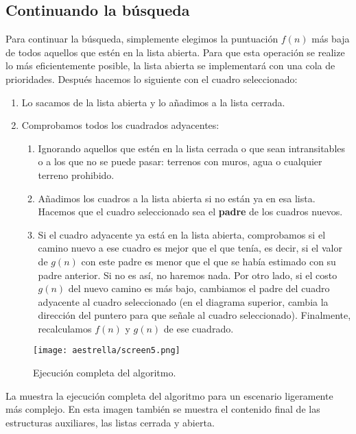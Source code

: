 \subsection{Continuando la b\'usqueda}

Para continuar la búsqueda, simplemente elegimos la puntuación \(f(n)\) más baja de todos aquellos que estén en la lista abierta. Para que esta operación se realize lo más eficientemente posible, la lista abierta se implementará con una cola de prioridades. Después hacemos lo siguiente con el cuadro seleccionado:

\begin{enumerate}
  \item Lo sacamos de la lista abierta y lo añadimos a la lista cerrada.  

  \item Comprobamos todos los cuadrados adyacentes:
  
  \begin{enumerate}
   \item Ignorando aquellos que estén en la lista cerrada o que sean intransitables o a los que no se puede pasar: terrenos con muros, agua o cualquier terreno prohibido.
   
   \item Añadimos los cuadros a la lista abierta si no están ya en esa lista. Hacemos que el cuadro seleccionado sea el \textbf{padre} de los cuadros nuevos.
   
   \item Si el cuadro adyacente ya está en la lista abierta, comprobamos si el camino nuevo a ese cuadro es mejor que el que tenía, es decir, si el valor de \(g(n)\) con este padre es menor que el que se había estimado con su padre anterior. Si no es así, no haremos nada. Por otro lado, si el costo \(g(n)\) del nuevo camino es más bajo, cambiamos el padre del cuadro adyacente al cuadro seleccionado (en el diagrama superior, cambia la dirección del puntero para que señale al cuadro seleccionado). Finalmente, recalculamos \(f(n)\) y \(g(n)\) de ese cuadrado.
  \end{enumerate}
\end{enumerate}


\begin{figure}[h!]
  \centering
  \texttt{[image: aestrella/screen5.png]}
  \caption{Ejecución completa del algoritmo.}
  \label{fig:fig4P4}
\end{figure}

La  muestra la ejecución completa del algoritmo para un escenario ligeramente más complejo.  En esta imagen también se muestra el contenido final de las estructuras auxiliares, las listas cerrada y abierta.


